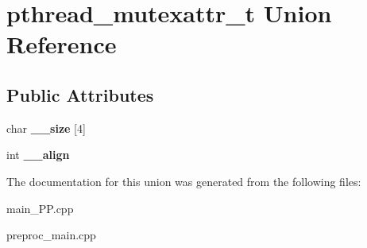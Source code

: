 \hypertarget{unionpthread__mutexattr__t}{\section{pthread\+\_\+mutexattr\+\_\+t Union Reference}
\label{unionpthread__mutexattr__t}
}
\subsection*{Public Attributes}
\begin{DoxyCompactItemize}
\item 
\hypertarget{unionpthread__mutexattr__t_a895680cb940172955d7c448ab6a12f19}{char {\bfseries \+\_\+\+\_\+size} \mbox{[}4\mbox{]}}\label{unionpthread__mutexattr__t_a895680cb940172955d7c448ab6a12f19}

\item 
\hypertarget{unionpthread__mutexattr__t_acd638babf3a7cd2d4d576938de9fe8e8}{int {\bfseries \+\_\+\+\_\+align}}\label{unionpthread__mutexattr__t_acd638babf3a7cd2d4d576938de9fe8e8}

\end{DoxyCompactItemize}


The documentation for this union was generated from the following files\+:\begin{DoxyCompactItemize}
\item 
main\+\_\+\+P\+P.\+cpp\item 
preproc\+\_\+main.\+cpp\end{DoxyCompactItemize}
